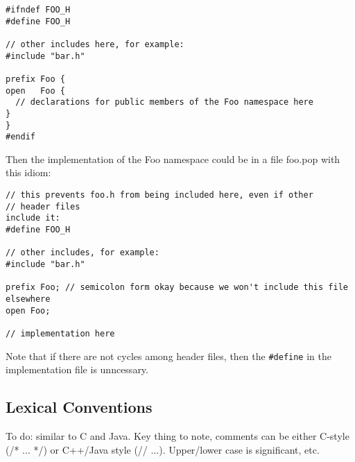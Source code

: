 \documentclass[titlepage,10pt]{article}
\begin{document}
\begin{verbatim}
#ifndef FOO_H 
#define FOO_H 

// other includes here, for example: 
#include "bar.h" 

prefix Foo { 
open   Foo { 
  // declarations for public members of the Foo namespace here 
} 
} 
#endif
\end{verbatim}

Then the implementation of the Foo namespace could be in a file foo.pop
with this idiom:


\begin{verbatim}
// this prevents foo.h from being included here, even if other 
// header files
include it: 
#define FOO_H 

// other includes, for example: 
#include "bar.h" 

prefix Foo; // semicolon form okay because we won't include this file
elsewhere 
open Foo; 

// implementation here
\end{verbatim}

Note that if there are not cycles among header files, then the
\texttt{\#define} in the implementation file is unncessary.


\subsection{Lexical Conventions}

To do:  similar to C and Java.  Key thing to note, comments can be
either C-style (/* ... */) or C++/Java style (// ...). Upper/lower case
is significant, etc.
\end{document}

